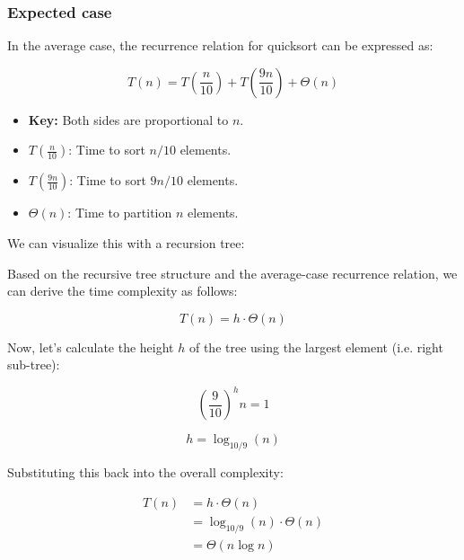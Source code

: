     \subsubsection{Expected case}
    \begin{derivation}
        In the average case, the recurrence relation for quicksort can be expressed as:

        \[
        T(n) = T\left(\frac{n}{10}\right) + T\left(\frac{9n}{10}\right) + \Theta(n)
        \]
        \begin{itemize}
            \item \textbf{Key:} Both sides are proportional to $n$.
            \item $T\left(\frac{n}{10}\right)$: Time to sort $n/10$ elements.
            \item $T\left(\frac{9n}{10}\right)$: Time to sort $9n/10$ elements.
            \item $\Theta(n)$: Time to partition $n$ elements.
        \end{itemize}

        \noindent We can visualize this with a recursion tree:


        \noindent Based on the recursive tree structure and the average-case recurrence relation, we can derive the time complexity as follows:

        \[
        T(n) = h \cdot \Theta(n)
        \]

        \noindent Now, let's calculate the height \( h \) of the tree using the largest element (i.e. right sub-tree):

        \[
        \left(\frac{9}{10}\right)^h n = 1
        \]

        \[
        h = \log_{10/9}(n) 
        \]

        \noindent Substituting this back into the overall complexity:

        \begin{align*}
        T(n) &= h \cdot \Theta(n) \\
            &= \log_{10/9}(n) \cdot \Theta(n) \\
            &= \Theta(n \log n)
        \end{align*}

    \end{derivation}

